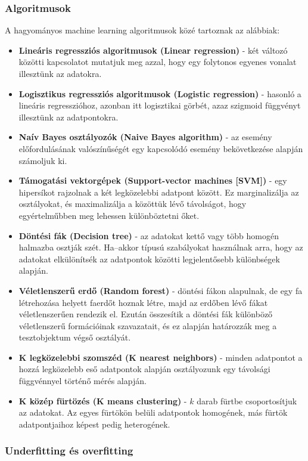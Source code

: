 \subsubsection{Algoritmusok}

A hagyományos machine learning algoritmusok közé tartoznak az alábbiak:

\begin{itemize}
\item \textbf{Lineáris regressziós algoritmusok (Linear regression)} - két változó közötti kapcsolatot mutatjuk meg azzal, hogy egy folytonos egyenes vonalat illesztünk az adatokra.
\item \textbf{Logisztikus regressziós algoritmusok (Logistic regression)} - hasonló a lineáris regresszióhoz, azonban itt logisztikai görbét, azaz szigmoid függvényt illesztünk az adatpontokra.
\item \textbf{Naív Bayes osztályozók (Naive Bayes algorithm)} - az esemény előfordulásának valószínűségét egy kapcsolódó esemény bekövetkezése alapján számoljuk ki.
\item \textbf{Támogatási vektorgépek (Support-vector machines [SVM])} - egy hipersíkot rajzolnak a két legközelebbi adatpont között. Ez marginalizálja az osztályokat, és maximalizálja a közöttük lévő távolságot, hogy egyértelműbben meg lehessen különböztetni őket.
\item \textbf{Döntési fák (Decision tree)} - az adatokat kettő vagy több homogén halmazba osztják szét. Ha–akkor típusú szabályokat használnak arra, hogy az adatokat elkülönítsék az adatpontok közötti legjelentősebb különbségek alapján.
\item \textbf{Véletlenszerű erdő (Random forest)} - döntési fákon alapulnak, de egy fa létrehozása helyett faerdőt hoznak létre, majd az erdőben lévő fákat véletlenszerűen rendezik el. Ezután összesítik a döntési fák különböző véletlenszerű formációinak szavazatait, és ez alapján határozzák meg a tesztobjektum végső osztályát.
\item \textbf{K legközelebbi szomszéd (K nearest neighbors)} - minden adatpontot a hozzá legközelebb eső adatpontok alapján osztályozunk egy távolsági függvénnyel történő mérés alapján. 
\item \textbf{K közép fürtözés (K means clustering)} - \(k\) darab fürtbe csoportosítjuk az adatokat. Az egyes fürtökön belüli adatpontok homogének, más fürtök adatpontjaihoz képest pedig heterogének. \cite{azure}
\end{itemize}


\subsubsection{Underfitting és overfitting}


